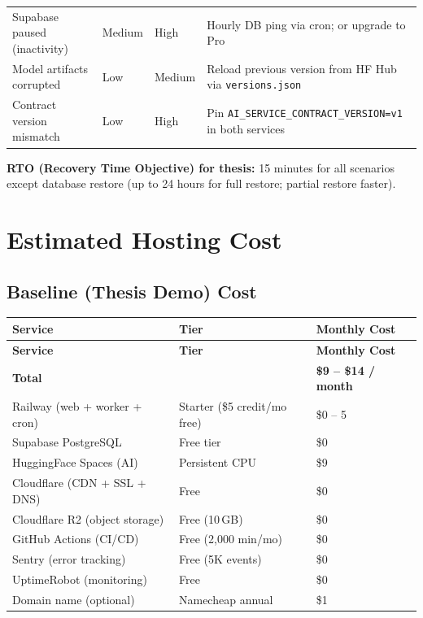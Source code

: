 \documentclass[12pt,a4paper]{report}
\begin{document}
\begin{longtable}{L{3.5cm} C{1.8cm} C{1.8cm} L{4cm}}
    Supabase paused (inactivity) &
    \textcolor{warningorange}{Medium} &
    \textcolor{dangerred}{High} &
    Hourly DB ping via cron; or upgrade to Pro \\[6pt]

    Model artifacts corrupted &
    \textcolor{successgreen}{Low} &
    \textcolor{warningorange}{Medium} &
    Reload previous version from HF Hub via \texttt{versions.json} \\[6pt]

    Contract version mismatch &
    \textcolor{successgreen}{Low} &
    \textcolor{dangerred}{High} &
    Pin \texttt{AI\_SERVICE\_CONTRACT\_VERSION=v1} in both services \\

\end{longtable}

\textbf{RTO (Recovery Time Objective) for thesis:} 15 minutes for all
scenarios except database restore (up to 24 hours for full restore;
partial restore faster).

\chapter{Estimated Hosting Cost}
\label{ch:cost}

\section{Baseline (Thesis Demo) Cost}

\begin{longtable}{L{5cm} L{3.5cm} R{3cm}}
    \toprule
    \textbf{Service} & \textbf{Tier} & \textbf{Monthly Cost} \\
    \midrule
    \endfirsthead
    \toprule
    \textbf{Service} & \textbf{Tier} & \textbf{Monthly Cost} \\
    \midrule
    \endhead
    \midrule
    \textbf{Total} & & \textbf{\$9 -- \$14 / month} \\
    \bottomrule
    \endlastfoot

    Railway (web + worker + cron) & Starter (\$5 credit/mo free) & \$0 -- 5 \\[4pt]
    Supabase PostgreSQL & Free tier & \$0 \\[4pt]
    HuggingFace Spaces (AI) & Persistent CPU & \$9 \\[4pt]
    Cloudflare (CDN + SSL + DNS) & Free & \$0 \\[4pt]
    Cloudflare R2 (object storage) & Free (10\,GB) & \$0 \\[4pt]
    GitHub Actions (CI/CD) & Free (2,000 min/mo) & \$0 \\[4pt]
    Sentry (error tracking) & Free (5K events) & \$0 \\[4pt]
    UptimeRobot (monitoring) & Free & \$0 \\[4pt]
    Domain name (optional) & Namecheap annual & \$1 \\

\end{longtable}
\end{document}
